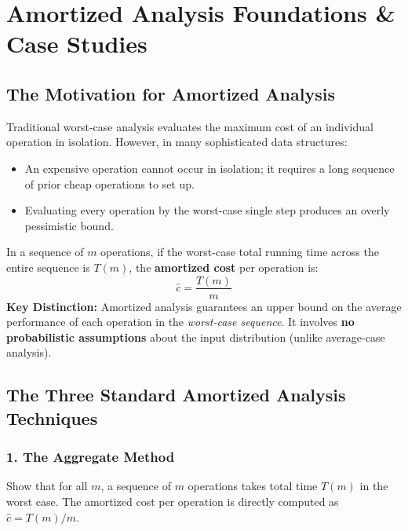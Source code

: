 \documentclass[11pt,a4paper]{article}
\begin{document}
\newpage
\section{Amortized Analysis Foundations \& Case Studies}

\subsection{The Motivation for Amortized Analysis}
Traditional worst-case analysis evaluates the maximum cost of an individual operation in isolation. However, in many sophisticated data structures:
\begin{itemize}[itemsep=1pt]
    \item An expensive operation cannot occur in isolation; it requires a long sequence of prior cheap operations to set up.
    \item Evaluating every operation by the worst-case single step produces an overly pessimistic bound.
\end{itemize}

\begin{definitionbox}
In a sequence of $m$ operations, if the worst-case total running time across the entire sequence is $T(m)$, the \textbf{amortized cost} per operation is:
\[
\hat{c} = \frac{T(m)}{m}
\]
\textbf{Key Distinction:} Amortized analysis guarantees an upper bound on the average performance of each operation in the \emph{worst-case sequence}. It involves \textbf{no probabilistic assumptions} about the input distribution (unlike average-case analysis).
\end{definitionbox}

\subsection{The Three Standard Amortized Analysis Techniques}

\subsubsection{1. The Aggregate Method}
Show that for all $m$, a sequence of $m$ operations takes total time $T(m)$ in the worst case. The amortized cost per operation is directly computed as $\hat{c} = T(m) / m$.
\end{document}
